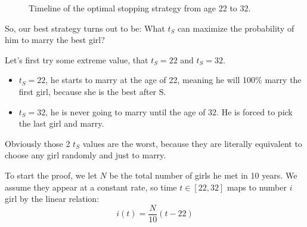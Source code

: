 \documentclass{article}
\begin{document}
\begin{figure}[H]
\centering
{}
\caption{Timeline of the optimal stopping strategy from age 22 to 32.}
\label{fig:stopping_timeline}
\end{figure}

So, our best strategy turns out to be: What $t_S$ can maximize the probability of him to marry the best girl? 

Let's first try some extreme value, that $t_S = 22$ and $t_S = 32$.
\begin{itemize}[itemsep=4pt, topsep=4pt]
    \item $t_S = 22$, he starts to marry at the age of 22, meaning he will {100\%} marry the first girl, because she is the best after S. 
    \item  $t_S = 32$, he is never going to marry until the age of 32. He is forced to pick the last girl and marry. 
\end{itemize}

Obviously those 2 $t_S$ values are the worst, because they are literally equivalent to choose any girl randomly and just to marry.  

To start the proof, we let $N$ be the total number of girls he met in 10 years. 
We assume they appear at a constant rate, so time $t \in [22, 32]$ maps to number $i$ girl by the linear relation:
\[ i(t) = \frac{N}{10}(t - 22) \]
\end{document}
